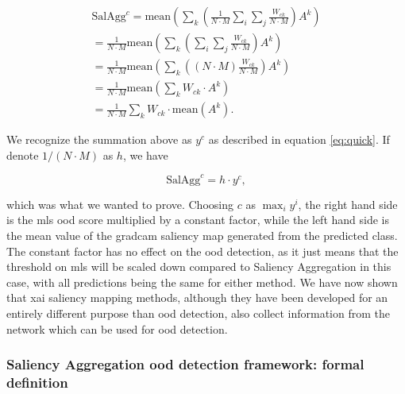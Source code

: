\documentclass[UKenglish]{uiomasterthesis} %
\theoremstyle{definition}
\begin{document}
\begin{gather}
    \text{SalAgg}^c = \text{mean} \left(\sum_k \left( \frac{1}{N \cdot M} \sum_i \sum_j \frac{W_{ck}}{N \cdot M} \right) A^k \right) \\
    = \frac{1}{N \cdot M} \text{mean} \left(\sum_k \left(  \sum_i \sum_j \frac{W_{ck}}{N \cdot M}  \right) A^k \right) \\
    = \frac{1}{N \cdot M} \text{mean} \left(\sum_k \left( (N \cdot M) \frac{W_{ck}}{N \cdot M} \right) A^k \right) \\
    = \frac{1}{N \cdot M} \text{mean} \left(\sum_k  W_{ck} \cdot A^k \right) \\
    = \frac{1}{N \cdot M} \sum_k  W_{ck} \cdot \text{mean}(A^k).
\end{gather}


We recognize the summation above as $y^c$ as described in equation \ref{eq:quick}. If denote $1 / (N \cdot M)$ as $h$, we have

\begin{equation}
    \text{SalAgg}^c = h \cdot y^c,
\end{equation}

which was what we wanted to prove. Choosing $c$ as $\max_i y^i$, the right hand side is the \ac{mls} \ac{ood} score multiplied by a constant factor, while the left hand side is the mean value of the \ac{gradcam} saliency map generated from the predicted class. The constant factor has no effect on the \ac{ood} detection, as it just means that the threshold on \ac{mls} will be scaled down compared to Saliency Aggregation in this case, with all predictions being the same for either method. We have now shown that \ac{xai} saliency mapping methods, although they have been developed for an entirely different purpose than \ac{ood} detection, also collect information from the network which can be used for \ac{ood} detection.

\subsubsection{Saliency Aggregation \ac{ood} detection framework: formal definition}
\end{document}
